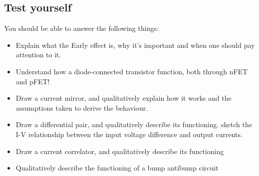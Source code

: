 \subsection{Test yourself}
You should be able to answer the following things: 
\begin{itemize}
    \item Explain what the Early effect is, why it's important and when one should pay attention to it.
    \item Understand how a diode-connected transistor function, both through nFET and pFET!
    \item Draw a current mirror, and qualitatively explain how it works and the assumptions taken to derive the behaviour. 
    \item Draw a differential pair, and qualitatively describe its functioning. sketch the I-V relationship between the input voltage difference and output currents. 
    \item Draw a current correlator, and qualitatively describe its functioning
    \item Qualitatively describe the functioning of a bump antibump circuit
\end{itemize}